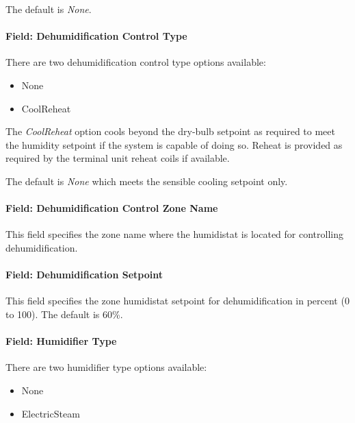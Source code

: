 The default is \emph{None}.

\paragraph{Field: Dehumidification Control Type}\label{field-dehumidification-control-type-3}

There are two dehumidification control type options available:

\begin{itemize}
\item
  None
\item
  CoolReheat
\end{itemize}

The \emph{CoolReheat} option cools beyond the dry-bulb setpoint as required to meet the humidity setpoint if the system is capable of doing so. Reheat is provided as required by the terminal unit reheat coils if available.

The default is \emph{None} which meets the sensible cooling setpoint only.

\paragraph{Field: Dehumidification Control Zone Name}\label{field-dehumidification-control-zone-name-2}

This field specifies the zone name where the humidistat is located for controlling dehumidification.

\paragraph{Field: Dehumidification Setpoint}\label{field-dehumidification-setpoint-2}

This field specifies the zone humidistat setpoint for dehumidification in percent (0 to 100). The default is 60\%.

\paragraph{Field: Humidifier Type}\label{field-humidifier-type-3}

There are two humidifier type options available:

\begin{itemize}
\item
  None
\item
  ElectricSteam
\end{itemize}

